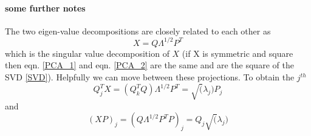 \documentclass{article}
\begin{document}
\paragraph{some further notes}
The two eigen-value decompositions are closely related to each other as
\begin{equation}
X = Q \Lambda^{1/2} P^T \label{SVD}
\end{equation}
which is the singular value decomposition of $X$ (if X is symmetric and square then eqn. \ref{PCA_1} and eqn. \ref{PCA_2} are the same and are the square of the SVD \eqref{SVD}).
Helpfully we can move between these projections. To obtain the $j^{th}$ 
\begin{equation}
Q_j^T X = (Q_k^T Q) \Lambda^{1/2} P^T = \sqrt(\lambda_j) P_j
\end{equation}
and
\begin{equation}
(XP)_{j} = (Q\Lambda^{1/2} P^T P)_{j} = Q_{j} \sqrt(\lambda_j)
\end{equation}
\end{document}
